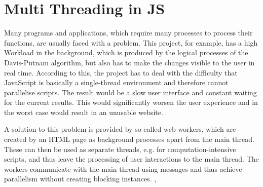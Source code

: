 \section{Multi Threading in JS}
\label{sec:tecWorker}
Many programs and applications, which require many processes to process their functions, are usually faced with a problem. This project, for example, has a high Workload in the background, which is produced by the logical processes of the Davis-Putnam algorithm, but also has to make the changes visible to the user in real time. According to this, the project has to deal with the difficulty that JavaScript is basically a single-thread environment and therefore cannot parallelise scripts. The result would be a slow user interface and constant waiting for the current results. This would significantly worsen the user experience and in the worst case would result in an unusable website.

A solution to this problem is provided by so-called web workers, which are created by an HTML page as background processes apart from the main thread. These can then be used as separate threads, e.g. for computation-intensive scripts, and thus leave the processing of user interactions to the main thread. The workers communicate with the main thread using messages and thus achieve parallelism without creating blocking instances. \cite{Peng2017}, \cite{Bidelman2010}